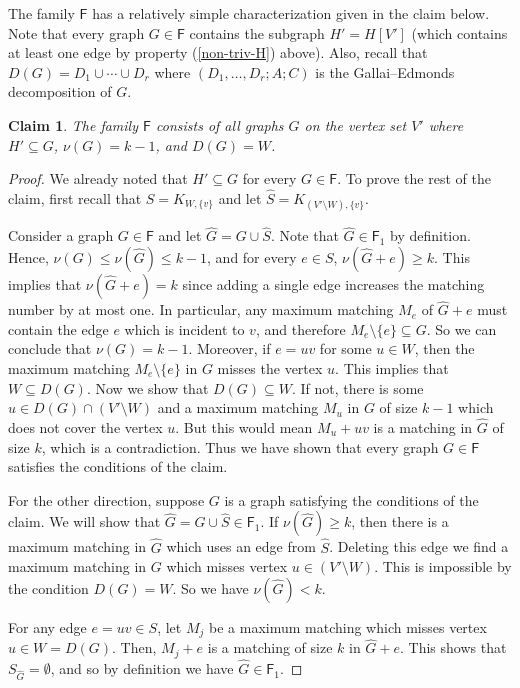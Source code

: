 \documentclass[10pt]{amsart}
\newtheorem{claim}[thm]{Claim}
\theoremstyle{definition}
\begin{document}
	\medskip
	
	The family $\mathsf{F}$ has a relatively simple characterization given in the claim below. Note that every graph $G\in\mathsf{F}$ contains the subgraph $H' = H[V']$ (which contains at least one edge by property (\ref{non-triv-H}) above). Also, recall that $D(G) = D_1\cup \cdots \cup D_r$ where $(D_1, \dots, D_r; A; C)$ is the Gallai--Edmonds decomposition of $G$. 
	
	
	\begin{claim}\label{d(g)=m}
		The family $\mathsf{F}$ consists of all graphs $G$ on the vertex set $V'$ where $H'\subseteq G$, $\nu(G)=k-1$, and $D(G)=W$.
	\end{claim}
	
	\begin{proof}
		We already noted that $H'\subseteq G$ for every $G\in \mathsf{F}$. To prove the rest of the claim, first recall that $S = K_{W, \{v\}}$ and let $\hat{S} = K_{(V'\setminus W), \{v\}}$. 
		
		Consider a graph $G\in \mathsf{F}$ and let $\hat{G} = G\cup \hat{S}$. Note that $\hat{G} \in \mathsf{F}_1$ by definition. Hence, $\nu(G) \leq \nu(\hat{G})\leq k-1$, and for every $e\in S$, $\nu(\hat{G}+e) \geq k$. This implies that $\nu(\hat{G}+e)=k$ since adding a single edge increases the matching number by at most one. In particular, any maximum matching $M_e$ of $\hat{G}+e$ must contain the edge $e$ which is incident to $v$, and therefore $M_e \setminus \{e\}\subseteq G$. So we can conclude that $\nu(G)=k-1$. Moreover, if $e=uv$ for some $u\in W$, then the maximum matching $M_e\setminus \{e\}$ in $G$ misses the vertex $u$. This implies that $W\subseteq D(G)$.
		Now we show that $D(G)\subseteq W$. If not, there is some $u\in D(G)\cap (V'\setminus W)$ and a maximum matching $M_u$ in $G$ of size $k-1$ which does not cover the vertex $u$. But this would mean $M_u + uv$ is a matching in $\hat{G}$ of size $k$, which is a contradiction. Thus we have shown that every graph $G\in \mathsf{F}$ satisfies the conditions of the claim. 
		
		For the other direction, suppose $G$ is a graph satisfying the conditions of the claim. We will show that $\hat{G}=G\cup \hat{S} \in \mathsf{F}_1$. If $\nu(\hat{G})\geq k$, then there is a maximum matching in $\hat{G}$ which uses an edge from $\hat{S}$. Deleting this edge we find a maximum matching in $G$ which misses vertex $u\in (V'\setminus W)$. This is impossible by the condition $D(G) = W$. So we have $\nu(\hat{G})<k$. 
		
		For any edge $e = uv\in S$, let $M_j$ be a maximum matching which misses vertex $u\in W = D(G)$. Then, $M_j + e$ is a matching of size $k$ in $\hat{G} + e$. This shows that $S_{\hat{G}} = \emptyset$, and so by definition we have $\hat{G}\in \mathsf{F}_1$. 
	\end{proof}
	
\end{document}
